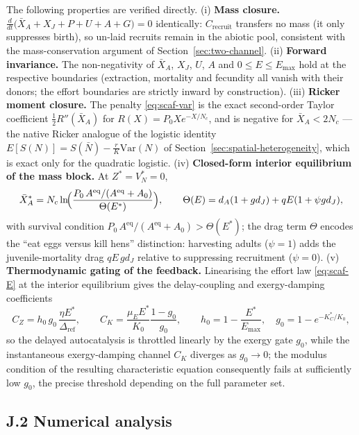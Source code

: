 \documentclass[twocolumn,10pt]{article}
\begin{document}
The following properties are verified directly. (i) \textbf{Mass closure.} $\frac{d}{dt}\bigl(\bar X_A + X_J + P + U + A + G\bigr) = 0$ identically: $C_{\mathrm{recruit}}$ transfers no mass (it only suppresses birth), so un-laid recruits remain in the abiotic pool, consistent with the mass-conservation argument of Section~\ref{sec:two-channel}. (ii) \textbf{Forward invariance.} The non-negativity of $\bar X_A$, $X_J$, $U$, $A$ and $0\le E\le E_{\max}$ hold at the respective boundaries (extraction, mortality and fecundity all vanish with their donors; the effort boundaries are strictly inward by construction). (iii) \textbf{Ricker moment closure.} The penalty \eqref{eq:scaf-var} is the exact second-order Taylor coefficient $\tfrac12 R''(\bar X_A)$ for $R(X)=P_0Xe^{-X/N_c}$, and is negative for $\bar X_A<2N_c$ --- the native Ricker analogue of the logistic identity $E[S(N)]=S(\bar N)-\frac{r}{K}\mathrm{Var}(N)$ of Section~\ref{sec:spatial-heterogeneity}, which is exact only for the quadratic logistic. (iv) \textbf{Closed-form interior equilibrium of the mass block.} At $Z^*=V_N^*=0$, \begin{equation}
\bar X_A^* = N_c\ln\!\Bigl(\frac{P_0\,A^{\mathrm{eq}}/(A^{\mathrm{eq}}+A_0)}{\Theta(E^*)}\Bigr),\qquad \Theta(E)=d_A(1+gd_J)+qE(1+\psi g d_J),
\label{eq:scaf-XAstar}
\end{equation}
with survival condition $P_0\,A^{\mathrm{eq}}/(A^{\mathrm{eq}}+A_0)>\Theta(E^*)$; the drag term $\Theta$ encodes the ``eat eggs versus kill hens'' distinction: harvesting adults ($\psi=1$) adds the juvenile-mortality drag $qE\,gd_J$ relative to suppressing recruitment ($\psi=0$). (v) \textbf{Thermodynamic gating of the feedback.} Linearising the effort law \eqref{eq:scaf-E} at the interior equilibrium gives the delay-coupling and exergy-damping coefficients
\begin{equation}
C_Z = h_0\,g_0\,\frac{\eta E^*}{\Delta_{\mathrm{ref}}},\qquad
C_K = \frac{\mu_E E^*}{K_0}\frac{1-g_0}{g_0},\qquad
h_0 = 1-\frac{E^*}{E_{\max}},\quad g_0 = 1-e^{-K_C^*/K_0},
\label{eq:scaf-C}
\end{equation}
so the delayed autocatalysis is throttled linearly by the exergy gate $g_0$, while the instantaneous exergy-damping channel $C_K$ diverges as $g_0\to0$; the modulus condition of the resulting characteristic equation consequently fails at sufficiently low $g_0$, the precise threshold depending on the full parameter set.

\subsection{J.2 Numerical analysis}
\end{document}
